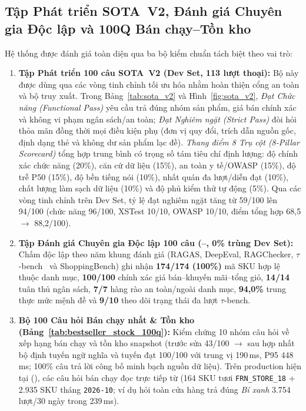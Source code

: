 \subsection*{Tập Phát triển SOTA~V2, Đánh giá Chuyên gia Độc lập và 100Q Bán chạy--Tồn kho}
Hệ thống được đánh giá toàn diện qua ba bộ kiểm chuẩn tách biệt theo vai trò:
\begin{enumerate}
    \item \textbf{Tập Phát triển 100 câu SOTA~V2 (Dev Set, 113 lượt thoại):} Bộ này được dùng qua các vòng tinh chỉnh tối ưu hóa nhằm hoàn thiện cổng an toàn và bộ truy xuất. Trong Bảng~\ref{tab:sota_v2} và Hình~\ref{fig:sota_v2}, \emph{Đạt Chức năng (Functional Pass)} yêu cầu trả đúng nhóm sản phẩm, giá bán chính xác và không vi phạm ngân sách/an toàn; \emph{Đạt Nghiêm ngặt (Strict Pass)} đòi hỏi thỏa mãn đồng thời mọi điều kiện phụ (đơn vị quy đổi, trích dẫn nguồn gốc, định dạng thẻ và không dư sản phẩm lạc đề). \emph{Thang điểm 8 Trụ cột (8-Pillar Scorecard)} tổng hợp trung bình có trọng số tám tiêu chí định lượng: độ chính xác chức năng (20\%), căn cứ dữ liệu (15\%), an toàn y tế/OWASP (15\%), độ trễ P50 (15\%), độ bền tiếng nói (10\%), nhất quán đa lượt/diễn đạt (10\%), chất lượng làm sạch dữ liệu (10\%) và độ phủ kiểm thử tự động (5\%). Qua các vòng tinh chỉnh trên Dev Set, tỷ lệ đạt nghiêm ngặt tăng từ 59/100 lên 94/100 (chức năng 96/100, XSTest 10/10, OWASP 10/10, điểm tổng hợp 68,5 $\to$ 88,2/100).
    \item \textbf{Tập Đánh giá Chuyên gia Độc lập 100 câu (--, 0\% trùng Dev Set):} Chấm độc lập theo năm khung đánh giá (RAGAS, DeepEval, RAGChecker, $\tau$-bench~\cite{yao2024taubench} và ShoppingBench) ghi nhận \textbf{174/174 (100\%)} mã SKU hợp lệ thuộc danh mục, \textbf{100/100} chính xác giá bán--khuyến mãi--tổng giỏ, \textbf{14/14} tuân thủ ngân sách, \textbf{7/7} hàng rào an toàn/ngoài danh mục, \textbf{94,0\%} trung thực mức mệnh đề và \textbf{9/10} theo dõi trạng thái đa lượt $\tau$-bench.
    \item \textbf{Bộ 100 Câu hỏi Bán chạy nhất \& Tồn kho (Bảng~\ref{tab:bestseller_stock_100q}):} Kiểm chứng 10 nhóm câu hỏi về xếp hạng bán chạy và tồn kho snapshot (trước sửa 43/100 $\to$ sau hợp nhất bộ định tuyến ngữ nghĩa và tuyến  đạt 100/100 với trung vị 190\,ms, P95 448\,ms; 100\% câu trả lời công bố minh bạch nguồn dữ liệu). Trên production hiện tại (), các câu hỏi bán chạy đọc trực tiếp từ  (164 SKU tươi \texttt{FRN\_STORE\_18} + 2.935 SKU tháng \texttt{2026-10}; ví dụ hỏi toàn cửa hàng trả đúng \emph{Bí xanh} 3.754 lượt/30 ngày trong 239\,ms).
\end{enumerate}

